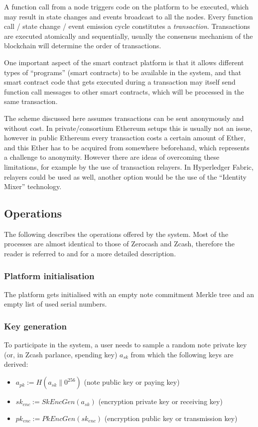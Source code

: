 \documentclass{article}
\newcommand{\conc}{\mathbin{\|}}
\begin{document}
A function call from a node triggers code on the platform to be executed, which may result in state changes and events broadcast to all the nodes. Every function call / state change / event emission cycle constitutes a \textit{transaction}. Transactions are executed atomically and sequentially, usually the consensus mechanism of the blockchain will determine the order of transactions.

One important aspect of the smart contract platform is that it allows different types of ``programs'' (smart contracts) to be available in the system, and that smart contract code that gets executed during a transaction  may itself send function call messages to other smart contracts, which will be processed in the same transaction.

The scheme discussed here assumes transactions can be sent anonymously and without cost. In private/consortium Ethereum setups this is usually not an issue, however in public Ethereum every transaction costs a certain amount of Ether, and this Ether has to be acquired from somewhere beforehand, which represents a challenge to anonymity. However there are ideas of overcoming these limitations, for example by the use of transaction relayers. In Hyperledger Fabric, relayers could be used as well, another option would be the use of the ``Identity Mixer'' technology.

\subsection{Operations} \label{operations}
The following describes the operations offered by the system. Most of the processes are almost identical to those of Zerocash and Zcash, therefore the reader is referred to \cite{zerocash} and \cite{zcash} for a more detailed description.

\subsubsection{Platform initialisation}
The platform gets initialised with an empty note commitment Merkle tree and an empty list of used serial numbers.
\subsubsection{Key generation} \label{keygeneration}

To participate in the system, a user needs to sample a random note private key (or, in Zcash parlance, spending key) $a_{sk}$ from which the following keys are derived:
\begin{itemize}
    \item $a_{pk} := H(a_{sk} \conc 0^{256})$ (note public key or paying key)
    \item $sk_{enc} := SkEncGen(a_{sk})$ (encryption private key or receiving key)
    \item $pk_{enc} := PkEncGen(sk_{enc})$ (encryption public key or transmission key)
\end{itemize}
\end{document}
